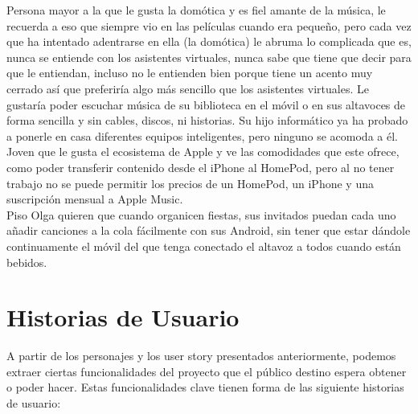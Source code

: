 Persona mayor a la que le gusta la domótica y es fiel amante de la música, le recuerda a eso que siempre vio en las películas cuando era pequeño, pero cada vez que ha intentado adentrarse en ella (la domótica) le abruma lo complicada que es, nunca se entiende con los asistentes virtuales, nunca sabe que tiene que decir para que le entiendan, incluso no le entienden bien porque tiene un acento muy cerrado así que preferiría algo más sencillo que los asistentes virtuales. Le gustaría poder escuchar música de su biblioteca en el móvil o en sus altavoces de forma sencilla y sin cables, discos, ni historias. Su hijo informático ya ha probado a ponerle en casa diferentes equipos inteligentes, pero ninguno se acomoda a él.\\

Joven que le gusta el ecosistema de Apple y ve las comodidades que este ofrece, como poder transferir contenido desde el iPhone al HomePod, pero al no tener trabajo no se puede permitir los precios de un HomePod, un iPhone y una suscripción mensual a Apple Music.\\

Piso Olga quieren que cuando organicen fiestas, sus invitados puedan cada uno añadir canciones a la cola fácilmente con sus Android, sin tener que estar dándole continuamente el móvil del que tenga conectado el altavoz a todos cuando están bebidos.\\

\section{Historias de Usuario}
A partir de los personajes y los user story presentados anteriormente, podemos extraer ciertas funcionalidades del proyecto que el público destino espera obtener o poder hacer. Estas funcionalidades clave tienen forma de las siguiente historias de usuario:

